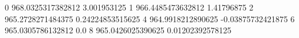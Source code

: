 0 968.0325317382812 3.001953125
1 966.4485473632812 1.41796875
2 965.2728271484375 0.24224853515625
4 964.9918212890625 -0.03875732421875
6 965.0305786132812 0.0
8 965.0426025390625 0.01202392578125
